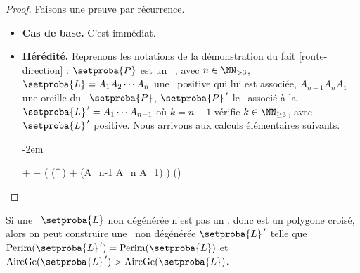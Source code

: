 \begin{proof}
    Faisons une preuve par récurrence.
    
    \begin{itemize}
		\item \textbf{Cas de base.} 
		C'est immédiat.
	
	
		\item \textbf{Hérédité.}
		Reprenons les notations de la démonstration du fait \ref{route-direction} : $\setproba{P}$ est un \ngone\ , avec $n \in \NN_{>3}$, $\setproba{L} = A_1 A_2 \cdots A_n$ une \nline\ positive qui lui est associée, $A_{n-1} A_n A_1$ une oreille du \ngone\ $\setproba{P}$, $\setproba{P}^{\,\prime}$ le \kgone\ associé à la \kline\ $\setproba{L}^{\,\prime} = A_1 \cdots A_{n-1}$ où $k = n-1$ vérifie $k \in \NN_{\geq3}$, avec $\setproba{L}^{\,\prime}$ positive. Nous arrivons aux calculs élémentaires suivants.

		\leavevmode\kern-2em%
		\begin{stepcalc}[style=ar*]
		          {}
		     + 
		          {}
		     + 
		          {}
		     \big( \mu(^{\,\prime}) + \mu(A_{n-1} A_n A_1) \big)
		          {}
		     \mu()
		          {}
		\end{stepcalc}
    \end{itemize}
\end{proof}




\begin{fact} \label{no-cross-max}
    Si une \nline\ $\setproba{L}$ non dégénérée n'est pas un \ngone, donc est un polygone croisé, alors on peut construire une \nline\ non dégénérée $\setproba{L}^{\,\prime}$ telle que 
	$\perim{\setproba{L}^{\,\prime}} = \perim{\setproba{L}}$ 
	et 
	$\garea{\setproba{L}^{\,\prime}} > \garea{\setproba{L}}$.
\end{fact}


